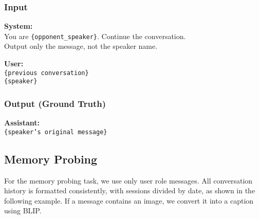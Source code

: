 \subsubsection{Input}
\begin{tcolorbox}[colback=systembg, colframe=black, sharp corners]
\textbf{System:} \\
You are \texttt{\{opponent\_speaker\}}. Continue the conversation. \\
Output only the message, not the speaker name.
\end{tcolorbox}

\begin{tcolorbox}[colback=userbg, colframe=black, sharp corners]
\textbf{User:} \\
\texttt{\{previous conversation\}} \\
\texttt{\{speaker\}}
\end{tcolorbox}

\subsubsection{Output (Ground Truth)}
\begin{tcolorbox}[colback=assistantbg, colframe=black, sharp corners]
\textbf{Assistant:} \\
\texttt{\{speaker's original message\}}
\end{tcolorbox}

\subsection{Memory Probing}
\label{ssec:appendix-memory-probing}
For the memory probing task, we use only user role messages.  
All conversation history is formatted consistently, with sessions divided by date, as shown in the following example.  
If a message contains an image, we convert it into a caption using BLIP.  

